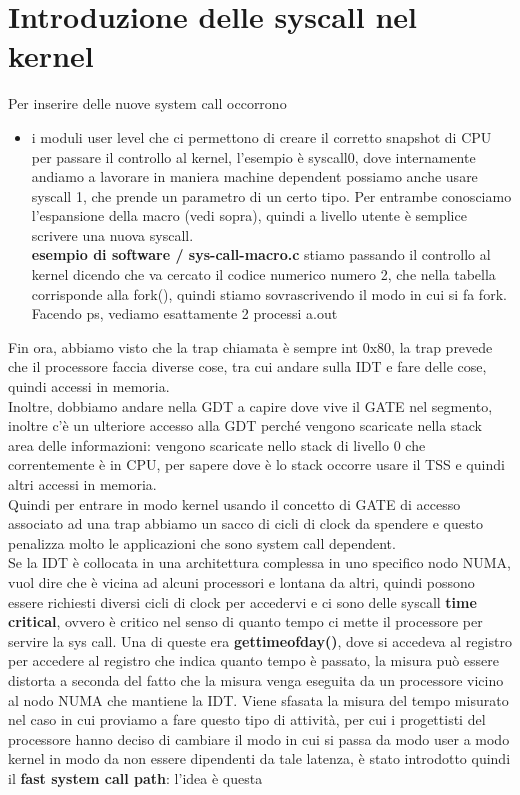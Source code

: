 \documentclass[12pt, oneside]{extbook}
\begin{document}
\section{Introduzione delle syscall nel kernel}
Per inserire delle nuove system call occorrono
\begin{itemize}
\item i moduli user level che ci permettono di creare il corretto snapshot di CPU per passare il controllo al kernel, l'esempio è syscall0, dove internamente andiamo a lavorare in maniera machine dependent
possiamo anche usare syscall 1, che prende un parametro di un certo tipo. Per entrambe conosciamo l'espansione della macro (vedi sopra), quindi a livello utente è semplice scrivere una nuova syscall.\\
\textbf{esempio di software / sys-call-macro.c}
stiamo passando il controllo al kernel dicendo che va cercato il codice numerico numero 2, che nella tabella corrisponde alla fork(), quindi stiamo sovrascrivendo il modo in cui si fa fork. Facendo \textsf{ps}, vediamo esattamente 2 processi a.out
\end{itemize}
Fin ora, abbiamo visto che la trap chiamata è sempre int 0x80, la trap prevede che il processore faccia diverse cose, tra cui andare sulla IDT e fare delle cose, quindi accessi in memoria.\\ Inoltre, dobbiamo andare nella GDT a capire dove vive il GATE nel segmento, inoltre c'è un ulteriore accesso alla GDT perché vengono scaricate nella stack area delle informazioni: vengono scaricate nello stack di livello 0 che correntemente è in CPU, per sapere dove è lo stack occorre usare il TSS e quindi altri accessi in memoria.\\ Quindi per entrare in modo kernel usando il concetto di GATE di accesso associato ad una trap abbiamo un sacco di cicli di clock da spendere e questo penalizza molto le applicazioni che sono system call dependent.\\ Se la IDT è collocata in una architettura complessa in uno specifico nodo NUMA, vuol dire che è vicina ad alcuni processori e lontana da altri, quindi possono essere richiesti diversi cicli di clock per accedervi e ci sono delle syscall \textbf{time critical}, ovvero è critico nel senso di quanto tempo ci mette il processore per servire la sys call. Una di queste era \textbf{gettimeofday()}, dove si accedeva al registro per accedere al registro che indica quanto tempo è passato, la misura può essere distorta a seconda del fatto che la misura venga eseguita da un processore vicino al nodo NUMA che mantiene la IDT. Viene sfasata la misura del tempo misurato nel caso in cui proviamo a fare questo tipo di attività, per cui i progettisti del processore hanno deciso di cambiare il modo in cui si passa da modo user a modo kernel in modo da non essere dipendenti da tale latenza, è stato introdotto quindi il \textbf{fast system call path}: l'idea è questa
\end{document}
